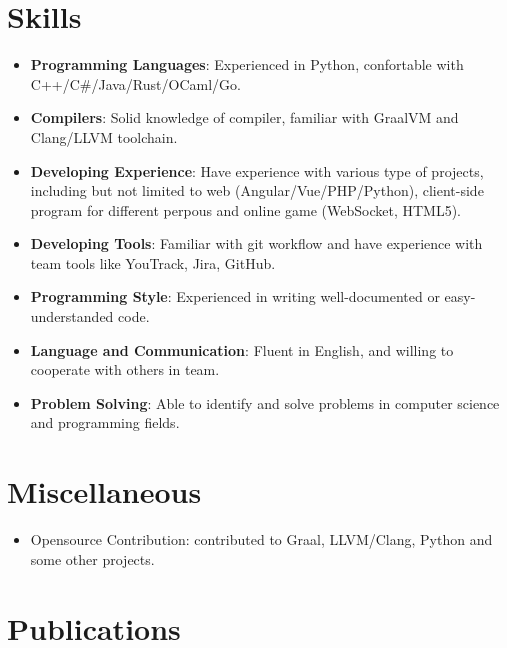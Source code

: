 \documentclass{resume}
\begin{document}
\section{Skills}
\begin{itemize}[parsep=0.25ex]
  \item \textbf{Programming Languages}:
    Experienced in Python, confortable with C++/C\#/Java/Rust/OCaml/Go.

  \item \textbf{Compilers}:
    Solid knowledge of compiler, familiar with GraalVM and Clang/LLVM toolchain.
  
  \item \textbf{Developing Experience}:
    Have experience with various type of projects, including but not limited to web (Angular/Vue/PHP/Python), client-side program for different perpous and online game (WebSocket, HTML5).

  \item \textbf{Developing Tools}:
    Familiar with git workflow and have experience with team tools like YouTrack, Jira, GitHub.
  
  \item \textbf{Programming Style}:
    Experienced in writing well-documented or easy-understanded code.
  
  \item \textbf{Language and Communication}:
    Fluent in English, and willing to cooperate with others in team.
  
  \item \textbf{Problem Solving}:
    Able to identify and solve problems in computer science and programming fields.
\end{itemize}

\section{Miscellaneous}
\begin{itemize}[parsep=0.25ex]
  \item Opensource Contribution: contributed to Graal, LLVM/Clang, Python and some other projects.
\end{itemize}

\section{Publications}


%
%
\end{document}
